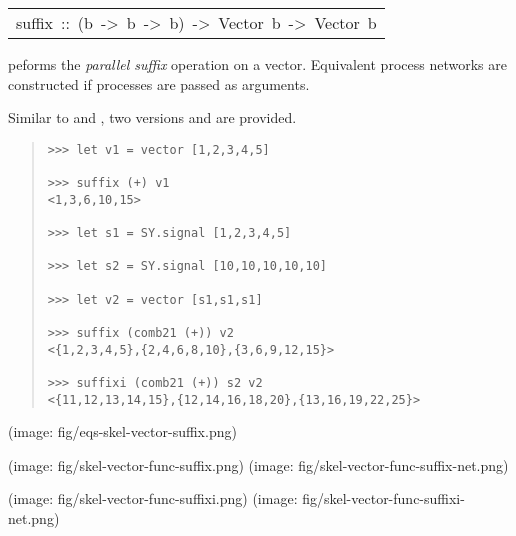 \begin{haddockdesc}
\item[\begin{tabular}{@{}l}
suffix\ ::\ (b\ ->\ b\ ->\ b)\ ->\ Vector\ b\ ->\ Vector\ b
\end{tabular}]\haddockbegindoc
{} peforms the \emph{parallel suffix} operation on a vector.
 Equivalent process networks are constructed if processes are passed
 as arguments.\par
Similar to  and , two versions  and
  are provided.\par
\begin{quote}
{\haddockverb\begin{verbatim}
>>> let v1 = vector [1,2,3,4,5]

>>> suffix (+) v1
<1,3,6,10,15>

>>> let s1 = SY.signal [1,2,3,4,5]

>>> let s2 = SY.signal [10,10,10,10,10]

>>> let v2 = vector [s1,s1,s1]

>>> suffix (comb21 (+)) v2
<{1,2,3,4,5},{2,4,6,8,10},{3,6,9,12,15}>

>>> suffixi (comb21 (+)) s2 v2
<{11,12,13,14,15},{12,14,16,18,20},{13,16,19,22,25}>

\end{verbatim}}
\end{quote}(image: fig/eqs-skel-vector-suffix.png)\par
           (image: fig/skel-vector-func-suffix.png)
 (image: fig/skel-vector-func-suffix-net.png)\par
           (image: fig/skel-vector-func-suffixi.png)
 (image: fig/skel-vector-func-suffixi-net.png)\par
           
\end{haddockdesc}
